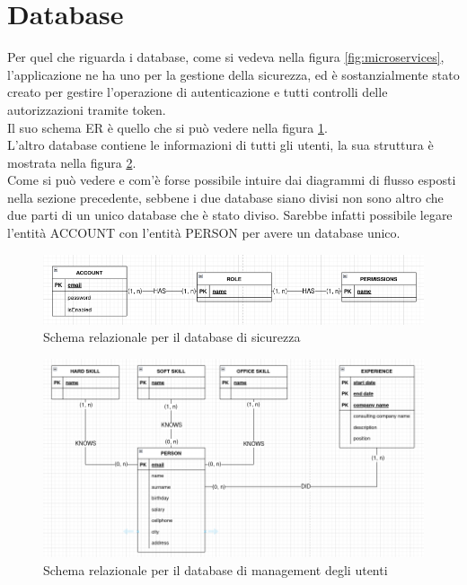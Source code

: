 \section{Database}
Per quel che riguarda i database, come si vedeva nella figura \ref{fig:microservices}, l'applicazione ne ha uno per la gestione della sicurezza, ed è sostanzialmente stato creato per gestire l'operazione di autenticazione e tutti controlli delle autorizzazioni tramite token.
\\
Il suo schema ER è quello che si può vedere nella figura \ref{security_db}.
\\
L'altro database contiene le informazioni di tutti gli utenti, la sua struttura è mostrata nella figura \ref{management_db}.
\\
Come si può vedere e com'è forse possibile intuire dai diagrammi di flusso esposti nella sezione precedente, sebbene i due database siano divisi non sono altro che due parti di un unico database che è stato diviso. Sarebbe infatti possibile legare l'entità ACCOUNT con l'entità PERSON per avere un database unico.
\begin{center}
    \begin{figure}
        \includegraphics[width=450px]{./images/security_db.png}
        \caption{Schema relazionale per il database di sicurezza}
        \label{security_db}
    \end{figure}
\end{center}
\begin{center}
    \begin{figure}
        \includegraphics[width=450px]{./images/management_db.png}
        \caption{Schema relazionale per il database di management degli utenti}
        \label{management_db}
    \end{figure}
\end{center}